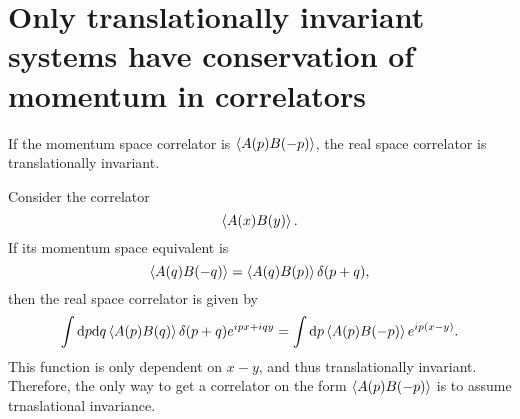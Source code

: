 \FloatBarrier
\section{Only translationally invariant systems have conservation of momentum in correlators}
\begin{theorem}
  If the momentum space correlator is $\braket{A(p)B(-p)}$, the real space correlator is translationally invariant.
\end{theorem}
\begin{Proof}
Consider the correlator
\begin{equation}
  \Braket{A(x)B(y)}.
\end{equation}
If its momentum space equivalent is
\begin{equation}
  \Braket{A(q)B(-q)} = \Braket{A(q)B(p)} \delta (p+q),
\end{equation}
then the real space correlator is given by
\begin{equation}
  \int \mathrm{d}p \mathrm{d}q
  \Braket{A(p)B(q)}\delta (p+q)
  e^{ipx + iqy}
  = \int \mathrm{d}p \Braket{A(p)B(-p)} e^{ip(x-y)}.
\end{equation}
This function is only dependent on $x-y$, and thus translationally invariant.
Therefore, the only way to get a correlator on the form $\braket{A(p)B(-p)}$ is to assume trnaslational invariance.
\end{Proof}
